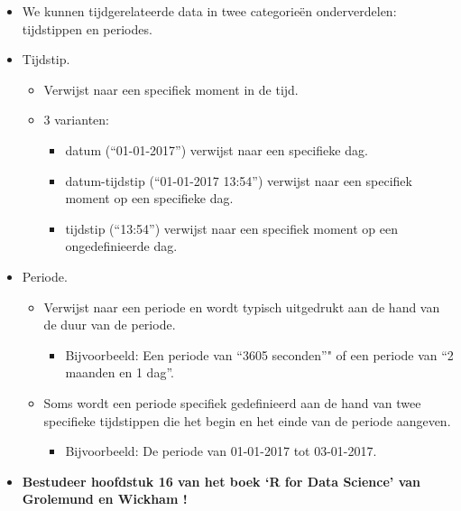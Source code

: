 \documentclass[]{memoir}
\providecommand{\tightlist}{%
  \setlength{\itemsep}{0pt}\setlength{\parskip}{0pt}}
\begin{document}
\begin{itemize}
\tightlist
\item
  We kunnen tijdgerelateerde data in twee categorieën onderverdelen:
  tijdstippen en periodes.
\item
  Tijdstip.

  \begin{itemize}
  \tightlist
  \item
    Verwijst naar een specifiek moment in de tijd.
  \item
    3 varianten:

    \begin{itemize}
    \tightlist
    \item
      datum (``01-01-2017'') verwijst naar een specifieke dag.
    \item
      datum-tijdstip (``01-01-2017 13:54'') verwijst naar een specifiek
      moment op een specifieke dag.
    \item
      tijdstip (``13:54'') verwijst naar een specifiek moment op een
      ongedefinieerde dag.
    \end{itemize}
  \end{itemize}
\item
  Periode.

  \begin{itemize}
  \tightlist
  \item
    Verwijst naar een periode en wordt typisch uitgedrukt aan de hand
    van de duur van de periode.

    \begin{itemize}
    \tightlist
    \item
      Bijvoorbeeld: Een periode van ``3605 seconden''" of een periode
      van ``2 maanden en 1 dag''.
    \end{itemize}
  \item
    Soms wordt een periode specifiek gedefinieerd aan de hand van twee
    specifieke tijdstippen die het begin en het einde van de periode
    aangeven.

    \begin{itemize}
    \tightlist
    \item
      Bijvoorbeeld: De periode van 01-01-2017 tot 03-01-2017.
    \end{itemize}
  \end{itemize}
\item
  \textbf{Bestudeer hoofdstuk 16 van het boek `R for Data Science' van
  Grolemund en Wickham !}
\end{itemize}
\end{document}
